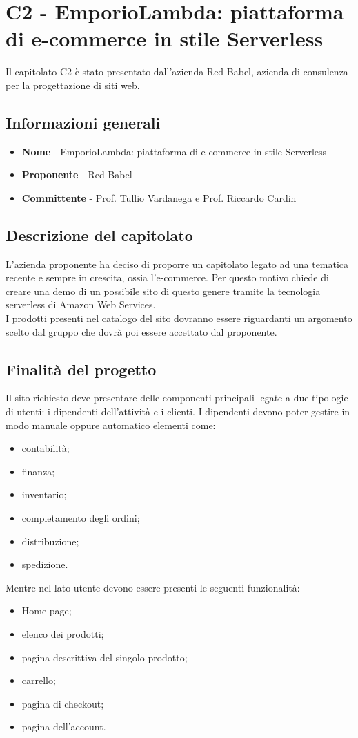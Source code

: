 \chapter{C2 - EmporioLambda: piattaforma di e-commerce in stile Serverless}
Il capitolato C2 è stato presentato dall'azienda Red Babel, azienda di consulenza per la progettazione di siti web.
\section{Informazioni generali}
\begin{itemize}
	\item \textbf{Nome} - EmporioLambda: piattaforma di e-commerce in stile Serverless
	\item \textbf{Proponente} - Red Babel
	\item \textbf{Committente} - Prof. Tullio Vardanega e Prof. Riccardo Cardin
\end{itemize}
\section{Descrizione del capitolato}
L'azienda proponente ha deciso di proporre un capitolato legato ad una tematica recente e sempre in crescita, ossia l'e-commerce. Per questo motivo chiede di creare una demo di un possibile sito di questo genere tramite la tecnologia serverless di Amazon Web Services. \\
I prodotti presenti nel catalogo del sito dovranno essere riguardanti un argomento scelto dal gruppo che dovrà poi essere accettato dal proponente.
\section{Finalità del progetto}
Il sito richiesto deve presentare delle componenti principali legate a due tipologie di utenti: i dipendenti dell'attività e i clienti. I dipendenti devono poter gestire in modo manuale oppure automatico elementi come:
\begin{itemize}
	\item  contabilità;
	\item finanza;
	\item inventario;
	\item completamento degli ordini;
	\item distribuzione;
	\item spedizione.
\end{itemize}
Mentre nel lato utente devono essere presenti le seguenti funzionalità:
\begin{itemize}
	\item Home page;
	\item elenco dei prodotti;
	\item pagina descrittiva del singolo prodotto;
	\item carrello;
	\item pagina di checkout;
	\item pagina dell'account.
\end{itemize}
